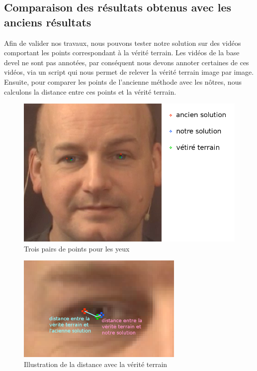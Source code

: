\newpage

\subsection{Comparaison des résultats obtenus avec les anciens résultats}
Afin de valider nos travaux, nous pouvons tester notre solution sur des vidéos comportant les points correspondant à 
la vérité terrain. Les vidéos de la base devel ne sont pas annotées, par conséquent nous devons annoter certaines de 
ces vidéos, via un script qui nous permet de relever la vérité terrain image par image. Ensuite, pour comparer les points 
de l'ancienne méthode avec les nôtres, nous calculons la distance entre ces points et la vérité terrain.\\

\begin{figure}[H]
  \centering
  \includegraphics[width=13cm]{image/visage_6points.png}
  \caption{Trois pairs de points pour les yeux}
\end{figure}

\begin{figure}[H]
  \centering
  \includegraphics[width=8cm]{image/eye_3points.png}
  \caption{Illustration de la distance avec la vérité terrain}
\end{figure}

